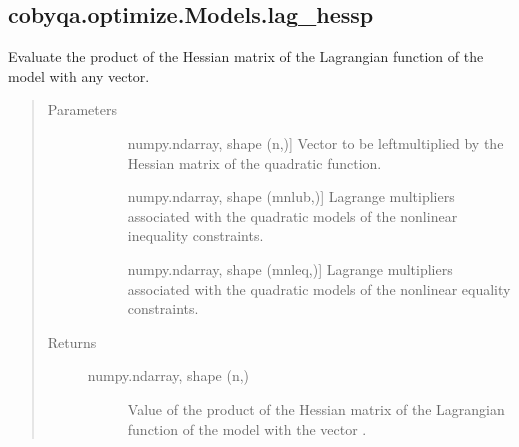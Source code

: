 \documentclass[letterpaper,10pt,english]{sphinxmanual}
\begin{document}
\begin{fulllineitems}
\subsection{cobyqa.optimize.Models.lag\_hessp}
\label{\detokenize{refs/generated/cobyqa.optimize.Models.lag_hessp:cobyqa-optimize-models-lag-hessp}}\label{\detokenize{refs/generated/cobyqa.optimize.Models.lag_hessp::doc}}

\begin{fulllineitems}
\label{\detokenize{refs/generated/cobyqa.optimize.Models.lag_hessp:cobyqa.optimize.Models.lag_hessp}}
\sphinxAtStartPar
Evaluate the product of the Hessian matrix of the Lagrangian function of
the model with any vector.
\begin{quote}\begin{description}
\item[{Parameters}] \leavevmode\begin{description}
\item[{}] \leavevmode{[}numpy.ndarray, shape (n,){]}
\sphinxAtStartPar
Vector to be left\sphinxhyphen{}multiplied by the Hessian matrix of the quadratic
function.

\item[{}] \leavevmode{[}numpy.ndarray, shape (mnlub,){]}
\sphinxAtStartPar
Lagrange multipliers associated with the quadratic models of the
nonlinear inequality constraints.

\item[{}] \leavevmode{[}numpy.ndarray, shape (mnleq,){]}
\sphinxAtStartPar
Lagrange multipliers associated with the quadratic models of the
nonlinear equality constraints.

\end{description}

\item[{Returns}] \leavevmode\begin{description}
\item[{numpy.ndarray, shape (n,)}] \leavevmode
\sphinxAtStartPar
Value of the product of the Hessian matrix of the Lagrangian
function of the model with the vector .

\end{description}


\end{description}
\end{quote}
\end{fulllineitems}
\end{fulllineitems}
\end{document}
